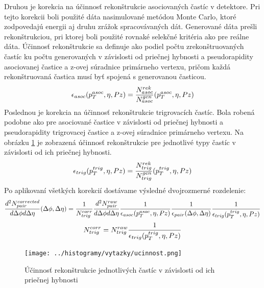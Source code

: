 \documentclass[thesismargins, thesislinespacing]{rnthesis}
\begin{document}
Druhou je korekcia na účinnosť rekonštrukcie asociovaných častíc v detektore. Pri tejto korekcii boli použité dáta nasimulované metódou Monte Carlo, ktoré zodpovedajú energii aj druhu zrážok spracovávaných dát. Generované dáta prešli \-re\-kon\-štruk\-ciou, pri ktorej boli použité rovnaké selekčné kritéria ako pre reálne dáta. Účinnosť re\-kon\-štruk\-cie sa definuje ako podiel počtu zrekonštruovaných častíc ku počtu generovaných v závislosti od priečnej hybnosti a  pseudorapidity asociovanej častice a z-ovej súradnice primárneho vertexu, pričom každá rekonštruovaná častica musí byť spojená s generovanou časticou.  
\begin{equation}
\footnotesize
\epsilon_{asoc}(p_{T}^{asoc},\eta,Pz) = \frac{N_{asoc}^{rek}}{N_{asoc}^{gen}}(p_{T}^{asoc},\eta,Pz)
\end{equation}
Poslednou je korekcia na účinnosť rekonštrukcie trigrovacích častíc. Bola robená podobne ako pre asociované častice v závislosti od priečnej hybnosti a  pseudorapidity trigrovacej častice a z-ovej súradnice primárneho vertexu. Na obrázku \ref{uc} je zobrazená účinnosť rekonštrukcie pre jednotlivé typy častíc v závislosti od ich priečnej hybnosti.
\begin{equation}
\footnotesize
\epsilon_{trig}(p_{T}^{trig},\eta,Pz) = \frac{N_{trig}^{rek}}{N_{trig}^{gen}}(p_{T}^{trig},\eta,Pz)
\end{equation}
\begin{equation}\end{equation}
Po aplikovaní všetkých korekcií dostávame výsledné dvojrozmerné rozdelenie:
\begin{equation}
\footnotesize
\frac{d^2N^{corrected}_{pair}}{d\Delta\phi d\Delta\eta}(\Delta\phi,\Delta \eta)=
\frac{1}{N^{corr}_{trig}} \frac{d^2N^{raw}_{pair}}{d\Delta\phi d\Delta\eta} \frac{1}{\epsilon_{asoc}(p_{T}^{asoc},\eta,Pz)}\frac{1}{\epsilon_{pair}(\Delta\phi,\Delta\eta)}
\frac{1}{\epsilon_{trig}(p_{T}^{trig},\eta,Pz)}
\end{equation}
\begin{equation}
\footnotesize
N^{corr}_{trig}=N^{raw}_{trig}\frac{1}{\epsilon_{trig}(p_{T}^{trig},\eta,Pz)}
\end{equation}

\begin{figure}[hbtp!]
	\centering
	\texttt{[image: ../histogramy/vytazky/ucinnost.png]}
	\caption{Účinnosť rekonštrukcie jednotlivých častíc v závislosti od ich priečnej hybnosti}
	\label{uc}
\end{figure}
\end{document}
